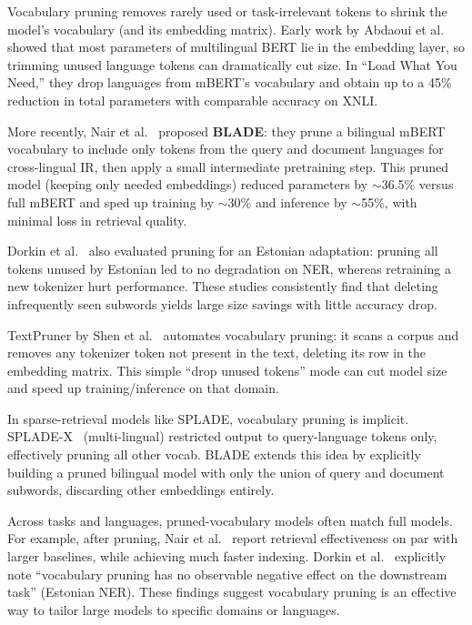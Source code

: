 \documentclass[twocolumn]{article}
\begin{document}
Vocabulary pruning removes rarely used or task-irrelevant tokens to shrink the model's vocabulary (and its embedding matrix). Early work by Abdaoui et al.~\cite{abdaoui2020load} showed that most parameters of multilingual BERT lie in the embedding layer, so trimming unused language tokens can dramatically cut size. In ``Load What You Need,'' they drop languages from mBERT's vocabulary and obtain up to a 45\% reduction in total parameters with comparable accuracy on XNLI.

More recently, Nair et al.~\cite{nair2023blade} proposed \textbf{BLADE}: they prune a bilingual mBERT vocabulary to include only tokens from the query and document languages for cross-lingual IR, then apply a small intermediate pretraining step. This pruned model (keeping only needed embeddings) reduced parameters by $\sim$36.5\% versus full mBERT and sped up training by $\sim$30\% and inference by $\sim$55\%, with minimal loss in retrieval quality.

Dorkin et al.~\cite{dorkin2025estonian} also evaluated pruning for an Estonian adaptation: pruning all tokens unused by Estonian led to no degradation on NER, whereas retraining a new tokenizer hurt performance. These studies consistently find that deleting infrequently seen subwords yields large size savings with little accuracy drop.

TextPruner by Shen et al.~\cite{shen2022textpruner} automates vocabulary pruning: it scans a corpus and removes any tokenizer token not present in the text, deleting its row in the embedding matrix. This simple ``drop unused tokens'' mode can cut model size and speed up training/inference on that domain.

In sparse-retrieval models like SPLADE, vocabulary pruning is implicit. SPLADE-X~\cite{formal2023spladex} (multi-lingual) restricted output to query-language tokens only, effectively pruning all other vocab. BLADE extends this idea by explicitly building a pruned bilingual model with only the union of query and document subwords, discarding other embeddings entirely.

Across tasks and languages, pruned-vocabulary models often match full models. For example, after pruning, Nair et al.~\cite{nair2023blade} report retrieval effectiveness on par with larger baselines, while achieving much faster indexing. Dorkin et al.~\cite{dorkin2025estonian} explicitly note ``vocabulary pruning has no observable negative effect on the downstream task'' (Estonian NER). These findings suggest vocabulary pruning is an effective way to tailor large models to specific domains or languages.
\end{document}
